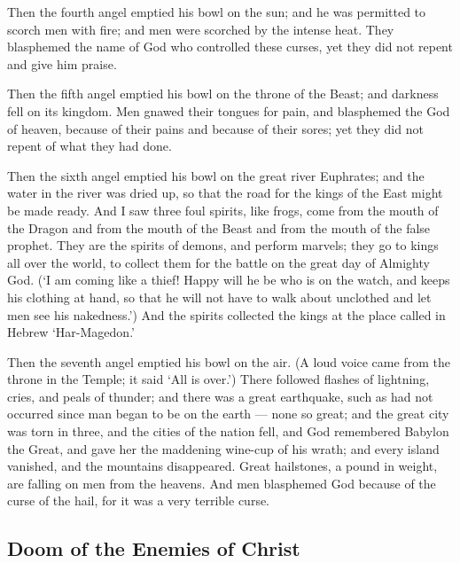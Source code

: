  Then the fourth angel emptied his bowl on the sun; and he
was permitted to scorch men with fire;  and men were
scorched by the intense heat. They blasphemed the name of God who
controlled these curses, yet they did not repent and give him praise.

 Then the fifth angel emptied his bowl on the throne of the
Beast; and darkness fell on its kingdom. Men gnawed their tongues for
pain,  and blasphemed the God of heaven, because of their
pains and because of their sores; yet they did not repent of what they
had done.

 Then the sixth angel emptied his bowl on the great river
Euphrates; and the water in the river was dried up, so that the road for
the kings of the East might be made ready.  And I saw three
foul spirits, like frogs, come from the mouth of the Dragon and from the
mouth of the Beast and from the mouth of the false prophet.
 They are the spirits of demons, and perform marvels; they
go to kings all over the world, to collect them for the battle on the
great day of Almighty God.  (`I am coming like a thief!
Happy will he be who is on the watch, and keeps his clothing at hand, so
that he will not have to walk about unclothed and let men see his
nakedness.')  And the spirits collected the kings at the
place called in Hebrew `Har-Magedon.'

 Then the seventh angel emptied his bowl on the air. (A
loud voice came from the throne in the Temple; it said `All is over.')
 There followed flashes of lightning, cries, and peals of
thunder; and there was a great earthquake, such as had not occurred
since man began to be on the earth --- none so great;  and
the great city was torn in three, and the cities of the nation fell, and
God remembered Babylon the Great, and gave her the maddening wine-cup of
his wrath;  and every island vanished, and the mountains
disappeared.  Great hailstones, a pound in weight, are
falling on men from the heavens. And men blasphemed God because of the
curse of the hail, for it was a very terrible curse.

\hypertarget{doom-of-the-enemies-of-christ}{%
\subsection{Doom of the Enemies of
Christ}\label{doom-of-the-enemies-of-christ}}


